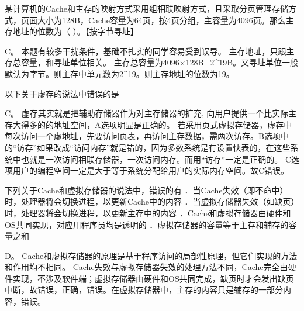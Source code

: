 \question 某计算机的Cache和主存的映射方式采用组相联映射方式，且采取分页管理存储方式，页面大小为128B，Cache容量为64页，按4页分组，主容量为4096页。那么主存地址的位数为（
）。【按字节寻址】
\par{}
\begin{solution}C。 本题有较多干扰条件，基础不扎实的同学容易受到误导。
主存地址，只跟主存总容量，和寻址单位相关。
主存总容量为4096×128B=2\^{}19B。又寻址单位一般默认为字节。则主存中单元数为2\^{}19。则主存地址的位数为19。
\end{solution}
\question 以下关于虚存的说法中错误的是
\par{}
\begin{solution}C。 虚存其实就是把辅助存储器作为对主存储器的扩充,
向用户提供一个比实际主存大得多的的地址空间，A选项明显是正确的。
若采用页式虚拟存储器，虚存中每次访问一个虚地址，先要访问页表，再访问主存数据，需两次访存。B选项中的``访存''如果改成``访问内存''就是错的，因为多数系统是有设置快表的，在这些系统中也就是一次访问相联存储器，一次访问内存。而用``访存''一定是正确的。
C选项用户的编程空间一定是大于等于系统分配给用户的实际内存空间。故C错误。
\end{solution}
\question 下列关于Cache和虚拟存储器的说法中，错误的有
．当Cache失效（即不命中）时，处理器将会切换进程，以更新Cache中的内容
．当虚拟存储器失效（如缺页）时，处理器将会切换进程，以更新主存中的内容
．Cache和虚拟存储器由硬件和OS共同实现，对应用程序员均是透明的
．虚拟存储器的容量等于主存和辅存的容量之和
\par{}
\begin{solution}D。
Cache和虚拟存储器的原理是基于程序访问的局部性原理，但它们实现的方法和作用均不相同。
Cache失效与虚拟存储器失效的处理方法不同，Cache完全由硬件实现，不涉及软件端；虚拟存储器由硬件和OS共同完成，缺页时才会发出缺页中断，故错误，正确，错误。在虚拟存储器中，主存的内容只是辅存的一部分内容，错误。
\end{solution}
